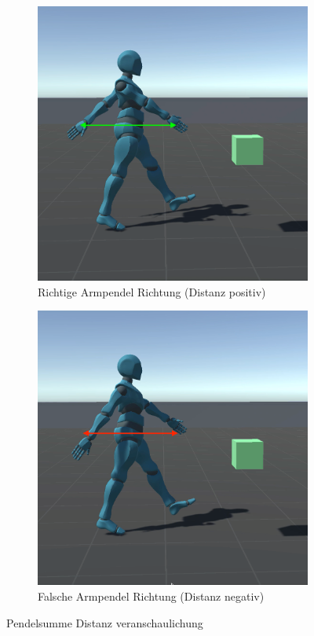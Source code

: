 \begin{figure}[H]
  \centering  
    \begin{subfigure}{.49\textwidth}
      \centering  
      \includegraphics[width=\textwidth]{img/hand_pendel_gut}
      \caption{Richtige Armpendel Richtung (Distanz positiv)}
      \label{fig:hand_pendel_gut}
    \end{subfigure}
    \begin{subfigure}{.49\textwidth}
      \centering  
      \includegraphics[width=\textwidth]{img/hand_pendel_schlecht}
      \caption{Falsche Armpendel Richtung (Distanz negativ)}
      \label{fig:hand_pendel_schlecht}
    \end{subfigure}
  \caption{Pendelsumme Distanz veranschaulichung}
  \label{fig:pendelsumme_distanz}
\end{figure}

